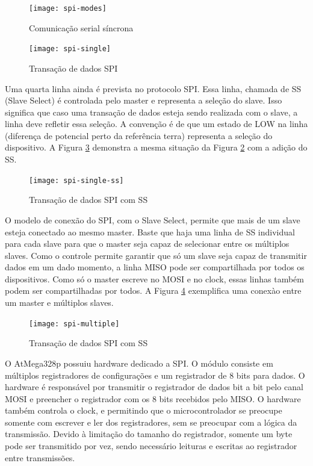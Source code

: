 \documentclass[11pt]{article}
\begin{document}
\begin{figure}
    \centering
    \texttt{[image: spi-modes]}
    \caption{Comunicação serial síncrona}
    \label{figspimodes}
\end{figure}
\begin{figure}
    \centering
    \texttt{[image: spi-single]}
    \caption{Transação de dados SPI}
    \label{figspisingle}
\end{figure}
\par Uma quarta linha ainda é prevista no protocolo SPI. Essa linha, chamada de SS (Slave Select) é controlada pelo master e representa a seleção do slave. Isso significa que caso uma transação de dados esteja sendo realizada com o slave, a linha deve refletir essa seleção. A convenção é de que um estado de LOW na linha (diferença de potencial perto da referência terra) representa a seleção do dispositivo. A Figura \ref{figspisingless} demonstra a mesma situação da Figura \ref{figspisingle} com a adição do SS.
\begin{figure}
    \centering
    \texttt{[image: spi-single-ss]}
    \caption{Transação de dados SPI com SS}
    \label{figspisingless}
\end{figure}
\par O modelo de conexão do SPI, com o Slave Select, permite que mais de um slave esteja conectado ao mesmo master. Baste que haja uma linha de SS individual para cada slave para que o master seja capaz de selecionar entre os múltiplos slaves. Como o controle permite garantir que só um slave seja capaz de transmitir dados em um dado momento, a linha MISO pode ser compartilhada por todos os dispositivos. Como só o master escreve no MOSI e no clock, essas linhas também podem ser compartilhadas por todos. A Figura \ref{figspimultiple} exemplifica uma conexào entre um master e múltiplos slaves.
\begin{figure}
    \centering
    \texttt{[image: spi-multiple]}
    \caption{Transação de dados SPI com SS}
    \label{figspimultiple}
\end{figure}
\par O AtMega328p possuiu hardware dedicado a SPI. O módulo consiste em múltiplos registradores de configurações e um registrador de 8 bits para dados. O hardware é responsável por transmitir o registrador de dados bit a bit pelo canal MOSI e preencher o registrador com os 8 bits recebidos pelo MISO. O hardware também controla o clock, e permitindo que o microcontrolador se preocupe somente com escrever e ler dos registradores, sem se preocupar com a lógica da transmissão. Devido à limitação do tamanho do registrador, somente um byte pode ser transmitido por vez, sendo necessário leituras e escritas ao registrador entre transmissões.
\end{document}
